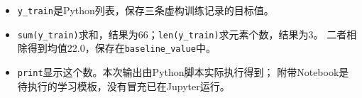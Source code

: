 \begin{itemize}[leftmargin=1.5em,itemsep=3pt,topsep=4pt]
\item \texttt{y\_train}是Python列表，保存三条虚构训练记录的目标值。
\item \texttt{sum(y\_train)}求和，结果为66；\texttt{len(y\_train)}求元素个数，结果为3。
二者相除得到均值22.0，保存在\texttt{baseline\_value}中。
\item \texttt{print}显示这个数。本次输出由Python脚本实际执行得到；
附带Notebook是待执行的学习模板，没有冒充已在Jupyter运行。
\end{itemize}
